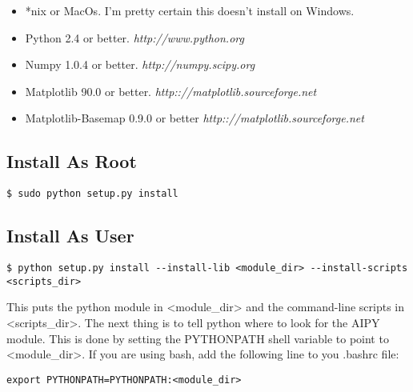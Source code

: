 \documentclass[10pt]{article}
\begin{document}
\begin{itemize}
\item[] *nix or MacOs.  I'm pretty certain this doesn't install on Windows.
\item[] Python 2.4 or better.  {\it http://www.python.org}
\item[] Numpy 1.0.4 or better. {\it http://numpy.scipy.org}
\item[] Matplotlib 90.0 or better. {\it http:://matplotlib.sourceforge.net}
\item[] Matplotlib-Basemap 0.9.0 or better
        {\it http:://matplotlib.sourceforge.net}
\end{itemize}

\subsection{Install As Root}

\begin{verbatim}
$ sudo python setup.py install
\end{verbatim}

\subsection{Install As User}

\begin{verbatim}
$ python setup.py install --install-lib <module_dir> --install-scripts <scripts_dir>
\end{verbatim}

This puts the python module in <module\_dir> and the command-line scripts
in <scripts\_dir>.  The next thing is to tell python where to look
for the AIPY module.  This is done by setting the PYTHONPATH shell variable
to point to <module\_dir>.  If you are using bash, add the following line
to you .bashrc file:
\begin{verbatim}
export PYTHONPATH=PYTHONPATH:<module_dir>
\end{verbatim}













\end{document}
